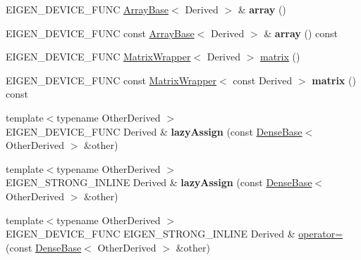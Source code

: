 \begin{DoxyCompactItemize}
E\+I\+G\+E\+N\+\_\+\+D\+E\+V\+I\+C\+E\+\_\+\+F\+U\+NC \mbox{\hyperlink{class_eigen_1_1_array_base}{Array\+Base}}$<$ Derived $>$ \& {\bfseries array} ()
\item 
\mbox{\label{class_eigen_1_1_array_base_a736ce9acdf2a7732f04633b2a6177d31}} 
E\+I\+G\+E\+N\+\_\+\+D\+E\+V\+I\+C\+E\+\_\+\+F\+U\+NC const \mbox{\hyperlink{class_eigen_1_1_array_base}{Array\+Base}}$<$ Derived $>$ \& {\bfseries array} () const
\item 
E\+I\+G\+E\+N\+\_\+\+D\+E\+V\+I\+C\+E\+\_\+\+F\+U\+NC \mbox{\hyperlink{class_eigen_1_1_matrix_wrapper}{Matrix\+Wrapper}}$<$ Derived $>$ \mbox{\hyperlink{class_eigen_1_1_array_base_ac513167ec762bbf639dc375d314d91d3}{matrix}} ()
\item 
\mbox{\label{class_eigen_1_1_array_base_ac8dd84288f041d38549b5ef455f2afa1}} 
E\+I\+G\+E\+N\+\_\+\+D\+E\+V\+I\+C\+E\+\_\+\+F\+U\+NC const \mbox{\hyperlink{class_eigen_1_1_matrix_wrapper}{Matrix\+Wrapper}}$<$ const Derived $>$ {\bfseries matrix} () const
\item 
\mbox{\label{class_eigen_1_1_array_base_ac91360b0526a36067915f63bf45b8b0e}} 
{\footnotesize template$<$typename Other\+Derived $>$ }\\E\+I\+G\+E\+N\+\_\+\+D\+E\+V\+I\+C\+E\+\_\+\+F\+U\+NC Derived \& {\bfseries lazy\+Assign} (const \mbox{\hyperlink{class_eigen_1_1_dense_base}{Dense\+Base}}$<$ Other\+Derived $>$ \&other)
\item 
\mbox{\label{class_eigen_1_1_array_base_a6a415a4d406deecbc35066f17d9eac8c}} 
{\footnotesize template$<$typename Other\+Derived $>$ }\\E\+I\+G\+E\+N\+\_\+\+S\+T\+R\+O\+N\+G\+\_\+\+I\+N\+L\+I\+NE Derived \& {\bfseries lazy\+Assign} (const \mbox{\hyperlink{class_eigen_1_1_dense_base}{Dense\+Base}}$<$ Other\+Derived $>$ \&other)
\item 
{\footnotesize template$<$typename Other\+Derived $>$ }\\E\+I\+G\+E\+N\+\_\+\+D\+E\+V\+I\+C\+E\+\_\+\+F\+U\+NC E\+I\+G\+E\+N\+\_\+\+S\+T\+R\+O\+N\+G\+\_\+\+I\+N\+L\+I\+NE Derived \& \mbox{\hyperlink{class_eigen_1_1_array_base_a581a7a353bd007b5352f11688e3bc5fa}{operator=}} (const \mbox{\hyperlink{class_eigen_1_1_dense_base}{Dense\+Base}}$<$ Other\+Derived $>$ \&other)
\item 

\end{DoxyCompactItemize}
